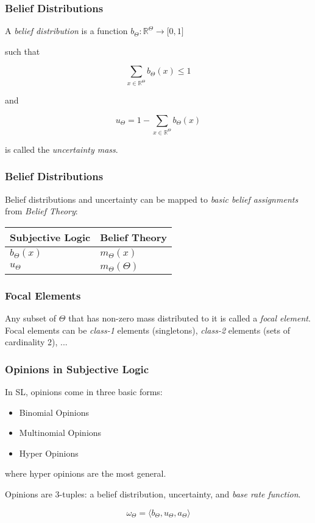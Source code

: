 \documentclass{beamer}
\begin{document}
\begin{frame}
\frametitle{Belief Distributions}

A \emph{belief distribution} is a function $b_\Theta: \mathbb{R}^\Theta \rightarrow \lbrack 0, 1 \rbrack$

such that

$$
\sum_{x \in \mathbb{R}^\Theta} b_\Theta \left( x \right) \leq 1
$$

and

$$
u_\Theta = 1 - \sum_{x \in \mathbb{R}^\Theta} b_\Theta \left( x \right)
$$

is called the \emph{uncertainty mass}.

\end{frame}

\begin{frame}
\frametitle{Belief Distributions}

Belief distributions and uncertainty can be mapped to \emph{basic belief assignments} from
\emph{Belief Theory}:


\begin{table}
\centering

\begin{tabular}{|l|l|}
  \hline
  Subjective Logic & Belief Theory \\
  \hline
  $b_\Theta\left( x \right)$ & $m_\Theta\left( x \right)$ \\
  $u_\Theta$                 & $m_\Theta \left(\Theta\right)$ \\
  \hline
\end{tabular}

\end{table}

\end{frame}

\begin{frame}
\frametitle{Focal Elements}

Any subset of $\Theta$ that has non-zero mass distributed to it is called a
\emph{focal element}. Focal elements can be \emph{class-1} elements (singletons),
\emph{class-2} elements (sets of cardinality 2), ...

\end{frame}

\begin{frame}
\frametitle{Opinions in Subjective Logic}

In SL, opinions come in three basic forms:

\begin{itemize}
  \item Binomial Opinions
  \item Multinomial Opinions
  \item Hyper Opinions
\end{itemize}

where hyper opinions are the most general.

Opinions are 3-tuples: a belief distribution, uncertainty, and \emph{base rate function}.

$$
\omega_\Theta = \langle b_\Theta, u_\Theta, a_\Theta \rangle
$$

\end{frame}
\end{document}
